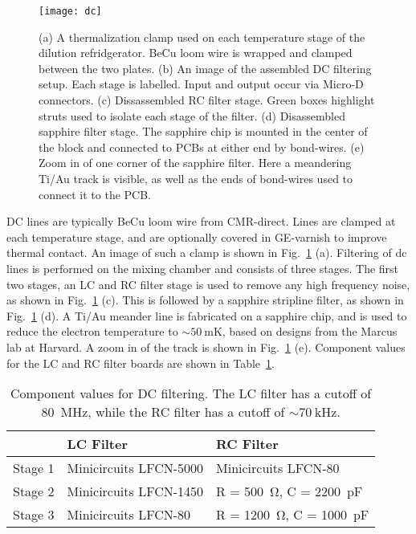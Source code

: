 \begin{figure}
    \texttt{[image: dc]}
    \caption[DC thermalization]
    {\label{fig:dc}(a) A thermalization clamp used on each temperature stage of the dilution refridgerator. BeCu loom
    wire is wrapped and clamped between the two plates. (b) An image of the assembled DC filtering setup. Each stage
    is labelled. Input and output occur via Micro-D connectors. (c) Dissassembled RC filter stage. Green boxes
    highlight struts used to isolate each stage of the filter. (d) Disassembled sapphire filter stage. The sapphire
    chip is mounted in the center of the block and connected to PCBs at either end by bond-wires. (e) Zoom in of
    one corner of the sapphire filter. Here a meandering Ti/Au track is visible, as well as the ends of bond-wires
    used to connect it to the PCB.}
\end{figure}

DC lines are typically BeCu loom wire from CMR-direct. Lines are clamped at each temperature stage, and are optionally
covered in GE-varnish to improve thermal contact. An image of such a clamp is shown in Fig.~\ref{fig:dc} (a). Filtering
of dc lines is performed on the mixing chamber and consists of three stages. The first two stages, an LC and RC filter
stage is used to remove any high frequency noise, as shown in Fig.~\ref{fig:dc} (c). This is followed by a sapphire
stripline filter, as shown in Fig.~\ref{fig:dc} (d). A Ti/Au meander line is fabricated on a sapphire chip, and is used
to reduce the electron temperature to $\sim \SI{50}{\milli\kelvin}$, based on designs from the Marcus lab at Harvard.
A zoom in of the track is shown in Fig.~\ref{fig:dc} (e). Component values for the LC and RC filter boards are shown in
Table~\ref{tab:filt}.

\begin{table}
    \centering
    \begin{tabular}{lll}
    \toprule
     & LC Filter & RC Filter \\
    \midrule
    Stage 1 & Minicircuits LFCN-5000 & Minicircuits LFCN-80\\
    Stage 2 & Minicircuits LFCN-1450 & R = \SI{500}{\ohm}, C = \SI{2200}{\pico\farad} \\
    Stage 3 & Minicircuits LFCN-80 & R = \SI{1200}{\ohm}, C = \SI{1000}{\pico\farad} \\
    \bottomrule
    \end{tabular}
    \caption[Component values for DC filers]{Component values for DC filtering. The LC filter has a cutoff of \SI{80}{\mega\hertz}, while the RC filter
    has a cutoff of $\sim \SI{70}{\kilo\hertz}$.}
    \label{tab:filt}
  \end{table}

